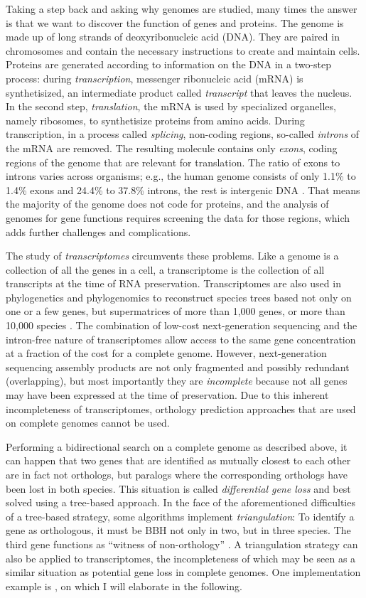 Taking a step back and asking why genomes are studied, many times the answer is
that we want to discover the function of genes and proteins. The genome is made
up of long strands of deoxyribonucleic acid (DNA). They are paired in
chromosomes and contain the necessary instructions to create and maintain cells.
Proteins are generated according to information on the DNA in a two-step
process: during \emph{transcription}, messenger ribonucleic acid (mRNA) is
synthetisized, an intermediate product called \emph{transcript} that leaves the
nucleus. In the second step, \emph{translation}, the mRNA is used by specialized
organelles, namely ribosomes, to synthetisize proteins from amino acids. During
transcription, in a process called \emph{splicing}, non-coding regions,
so-called \emph{introns} of the mRNA are removed. The resulting molecule
contains only \emph{exons}, coding regions of the genome that are relevant for
translation. The ratio of exons to introns varies across organisms; e.g., the
human genome consists of only 1.1\% to 1.4\% exons and 24.4\% to 37.8\% introns,
the rest is intergenic DNA \citep{venter2001}. That means the majority of the
genome does not code for proteins, and the analysis of genomes for gene
functions requires screening the data for those regions, which adds further
challenges and complications.

The study of \emph{transcriptomes} circumvents these problems. Like a genome is
a collection of all the genes in a cell, a transcriptome is the collection of
all transcripts at the time of RNA preservation. Transcriptomes are also used in
phylogenetics and phylogenomics to reconstruct species trees based not only on
one or a few genes, but supermatrices of more than 1,000 genes, or more than
10,000 species \citep{beiko2011}. The combination of low-cost next-generation
sequencing and the intron-free nature of transcriptomes allow access to the same
gene concentration at a fraction of the cost for a complete genome. However,
next-generation sequencing assembly products are not only fragmented and possibly
redundant (overlapping), but most importantly they are \emph{incomplete} because
not all genes may have been expressed at the time of preservation. Due to this
inherent incompleteness of transcriptomes, orthology prediction approaches that
are used on complete genomes cannot be used.

Performing a bidirectional search on a complete genome as described above, it
can happen that two genes that are identified as mutually closest to each other
are in fact not orthologs, but paralogs where the corresponding orthologs have
been lost in both species. This situation is called \emph{differential gene
loss} and best solved using a tree-based approach. In the face of the
aforementioned difficulties of a tree-based strategy, some algorithms implement
\emph{triangulation}: To identify a gene as orthologous, it must be BBH not only
in two, but in three species. The third gene functions as ``witness of
non-orthology'' \citep{dessimoz2006}. A triangulation strategy can also be
applied to transcriptomes, the incompleteness of which may be seen as a similar
situation as potential gene loss in complete genomes. One implementation example
is \hamstr \citep{ebersberger2009}, on which I will elaborate in the following.

